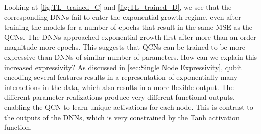 Looking at \autoref{fig:TL_trained_C} and \autoref{fig:TL_trained_D}, we see that the corresponding DNNs fail to enter the exponential growth regime, even after training the models for a number of epochs that result in the same MSE as the QCNs. The DNNs approached exponential growth first after more than an order magnitude more epochs. This suggests that QCNs can be trained to be more expressive than DNNs of similar number of parameters. How can we explain this increased expressivity? As discussed in \autoref{sec:Single Node Expressivity}, qubit encoding several features results in a representation of exponentially many interactions in the data, which also results in a more flexible output. The different parameter realizations produce very different functional outputs, enabling the QCN to learn unique activations for each node. This is contrast to the outputs of the DNNs, which is very constrained by the Tanh activation function. 


